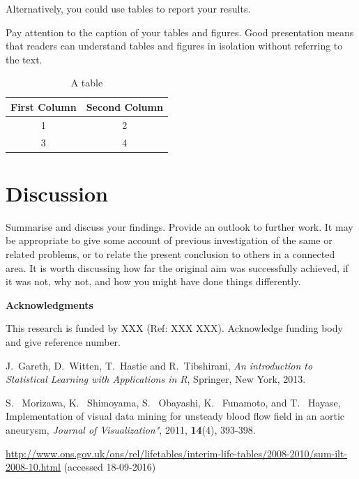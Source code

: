 \documentclass[a4paper,amsmath, 12pt]{article}
\begin{document}
Alternatively, you could use tables to report your results.

Pay attention to the caption of your tables and figures. Good presentation means that readers can understand tables and figures in isolation without referring to the text.


\begin{table}[h]
\caption{A table}
\begin{center}
\begin{tabular}{|c|c|}
\hline
First Column & Second Column \\
\hline
1 & 2 \\
\hline
3 & 4 \\
\hline
\end{tabular}
\end{center}
\end{table}




\section{Discussion}

Summarise and discuss your findings. Provide an outlook to further work. It may be appropriate to give some account of previous investigation of the same or related problems, or to relate the present conclusion to others in a connected area. It is worth discussing how far the original aim was successfully achieved, if it was not, why not, and how you might have done things differently.

\vspace{1cm}
\textbf{Acknowledgments}

This research is funded by XXX (Ref: XXX XXX). Acknowledge funding body and give reference number.



\begin{thebibliography}{100}

J.~Gareth, D.~Witten, T.~Hastie and R.~Tibshirani, \textsl{An introduction to Statistical Learning with Applications in R}, Springer, New York, 2013.

S.~ Morizawa, K.~ Shimoyama, S.~ Obayashi, K.~ Funamoto, and T.~ Hayase,
Implementation of visual data mining for unsteady blood flow field in an aortic aneurysm,
\textsl{Journal of Visualization"}, 2011, {\bf 14}(4), 393-398.

 \url{http://www.ons.gov.uk/ons/rel/lifetables/interim-life-tables/2008-2010/sum-ilt-2008-10.html} (accessed 18-09-2016)

\end{thebibliography}
\end{document}
